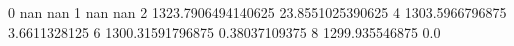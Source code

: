 0 nan nan
1 nan nan
2 1323.7906494140625 23.8551025390625
4 1303.5966796875 3.6611328125
6 1300.31591796875 0.38037109375
8 1299.935546875 0.0
